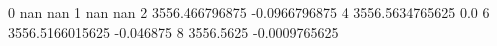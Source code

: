 0 nan nan
1 nan nan
2 3556.466796875 -0.0966796875
4 3556.5634765625 0.0
6 3556.5166015625 -0.046875
8 3556.5625 -0.0009765625
